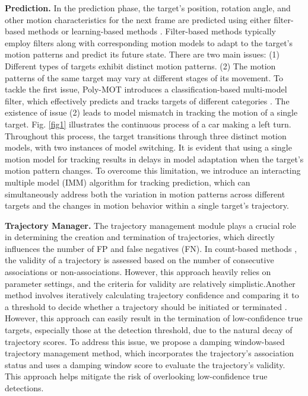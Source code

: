 \textbf{Prediction.} In the prediction phase, the target's position, rotation angle, and other motion characteristics for the next frame are predicted using either  filter-based methods or  learning-based methods \cite{weng3DMultiObjectTracking2020}. Filter-based methods typically employ filters along with corresponding motion models to adapt to the target's motion patterns and predict its future state. There are two main issues: (1) Different types of targets exhibit distinct motion patterns. (2) The motion patterns of the same target may vary at different stages of its movement. To tackle the first issue, Poly-MOT introduces a classification-based multi-model filter, which effectively predicts and tracks targets of different categories \cite{240313443FastPolyFast,liPolyMOTPolyhedralFramework2023}. The existence of issue (2) leads to model mismatch in tracking the motion of a single target.
Fig. \ref{fig1} illustrates the continuous process of a car making a left turn. Throughout this process, the target transitions through three distinct motion models, with two instances of model switching. It is evident that using a single motion model for tracking results in delays in model adaptation when the target's motion pattern changes. To overcome this limitation, we introduce an interacting multiple model (IMM) algorithm for tracking prediction, which can simultaneously address both the variation in motion patterns across different targets and the changes in motion behavior within a single target's trajectory.

\textbf{Trajectory Manager.} The trajectory management module plays a crucial role in determining the creation and termination of trajectories, which directly influences the number of FP and false negatives (FN). In count-based methods \cite{liPolyMOTPolyhedralFramework2023,benbarkaScoreRefinementConfidencebased2021}, the validity of a trajectory is assessed based on the number of consecutive associations or non-associations. However, this approach heavily relies on parameter settings, and the criteria for validity are relatively simplistic.Another method involves iteratively calculating trajectory confidence and comparing it to a threshold to decide whether a trajectory should be initiated or terminated \cite{240313443FastPolyFast,benbarkaScoreRefinementConfidencebased2021}. However, this approach can easily result in the termination of low-confidence true targets, especially those at the detection threshold, due to the natural decay of trajectory scores. To address this issue, we propose a damping window-based trajectory management method, which incorporates the trajectory's association status and uses a damping window score to evaluate the trajectory's validity. This approach helps mitigate the risk of overlooking low-confidence true detections.